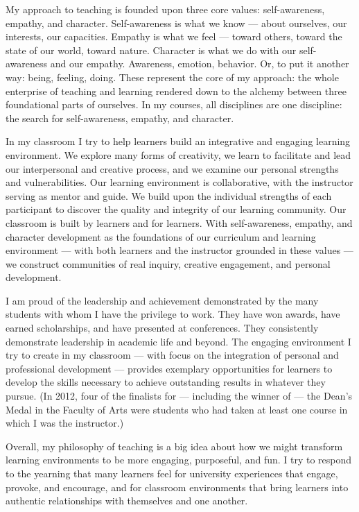 \documentclass[12pt, letterpaper]{article}
\begin{document}
My approach to teaching is founded upon three core values: self-awareness, empathy, and character. Self-awareness is what we know — about ourselves, our interests, our capacities. Empathy is what we feel — toward others, toward the state of our world, toward nature. Character is what we do with our self-awareness and our empathy. Awareness, emotion, behavior. Or, to put it another way: being, feeling, doing. These represent the core of my approach: the whole enterprise of teaching and learning rendered down to the alchemy between three foundational parts of ourselves. In my courses, all disciplines are one discipline: the search for self-awareness, empathy, and character.

In my classroom I try to help learners build an integrative and engaging learning environment. We explore many forms of creativity, we learn to facilitate and lead our interpersonal and creative process, and we examine our personal strengths and vulnerabilities. Our learning environment is collaborative, with the instructor serving as mentor and guide. We build upon the individual strengths of each participant to discover the quality and integrity of our learning community. Our classroom is built by learners and for learners. With self-awareness, empathy, and character development as the foundations of our curriculum and learning environment — with both learners and the instructor grounded in these values — we construct communities of real inquiry, creative engagement, and personal development.

I am proud of the leadership and achievement demonstrated by the many students with whom I have the privilege to work. They have won awards, have earned scholarships, and have presented at conferences. They consistently demonstrate leadership in academic life and beyond. The engaging environment I try to create in my classroom — with focus on the integration of personal and professional development — provides exemplary opportunities for learners to develop the skills necessary to achieve outstanding results in whatever they pursue. (In 2012, four of the finalists for — including the winner of — the Dean’s Medal in the Faculty of Arts were students who had taken at least one course in which I was the instructor.)

Overall, my philosophy of teaching is a big idea about how we might transform learning environments to be more engaging, purposeful, and fun. I try to respond to the yearning that many learners feel for university experiences that engage, provoke, and encourage, and for classroom environments that bring learners into authentic relationships with themselves and one another.
\end{document}
